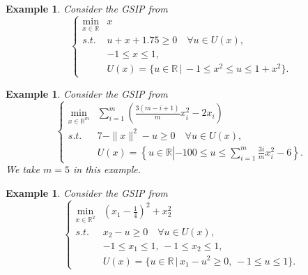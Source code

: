 \documentclass{amsart}
\theoremstyle{plain}
\newtheorem{exmp}[theorem]{Example}
\newcommand{\re}{\mathbb{R}}
\newcommand{\st}{\mathit{s.t.}}
\numberwithin{equation}{section}
\begin{document}
		\begin{exmp}\label{GlibP6}
			Consider the GSIP from \cite{Still2001}
			\[
			\left\{\begin{array}{ll}
				\min\limits_{x\in\re} & x\\
				\st & u+x+1.75\ge 0\quad \forall u\in U(x),\\
				& -1\le x\le 1,\\
				& U(x) = \{u\in\re\,\vert\, -1\le x^2\le u\le 1+x^2\}.
			\end{array}
			\right.
			\]
		\end{exmp}
		
		\begin{exmp}\label{GlibP8}
			Consider the GSIP from \cite{SSGSIPLib}
			\[
			\left\{\begin{array}{ll}
				\min\limits_{x\in\re^m} & \sum\limits_{i=1}^m \left(\frac{3(m-i+1)}{m}x_i^2-2x_i\right)\\
				\st & 7-\|x\|^2-u\ge 0\quad \forall u\in U(x),\\
				& U(x) = \left\{u\in\re\left| 
				-100\le u\le \sum\limits_{i=1}^m \frac{3i}{m}x_i^2-6 \right.\right\}.
			\end{array}
			\right.
			\]
			We take $m=5$ in this example. 
		\end{exmp}
		
		\begin{exmp}\label{GlibP10}
			Consider the GSIP from \cite{JongenRS98}
			\[
			\left\{\begin{array}{ll}
				\min\limits_{x\in\re^2} & (x_1-\frac{1}{4})^2+x_2^2\\
				\st & x_2-u\ge 0\quad \forall u\in U(x),\\
				& -1\le x_1\le 1,\, -1\le x_2\le 1,\\
				& U(x) = \{u\in\re\,\vert\, x_1-u^2\ge 0,\, -1\le u\le 1\}.
			\end{array}
			\right.
			\]
		\end{exmp}
		
\end{document}
